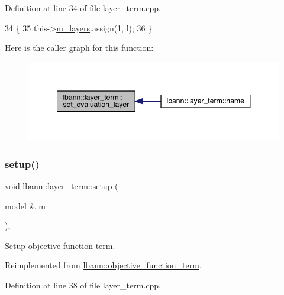Definition at line 34 of file layer\+\_\+term.\+cpp.


\begin{DoxyCode}
34                                               \{
35   this->\hyperlink{classlbann_1_1objective__function__term_a9269cf0a237eacd1e220ba2739f44334}{m\_layers}.assign(1, l);
36 \}
\end{DoxyCode}
Here is the caller graph for this function\+:\nopagebreak
\begin{figure}[H]
\begin{center}
\leavevmode
\includegraphics[width=348pt]{classlbann_1_1layer__term_a04ca36543288fb9c55ab99cc0cc2a648_icgraph}
\end{center}
\end{figure}
\mbox{\label{classlbann_1_1layer__term_ae6d84339fb80384ca2bf898fb854a7c9}} 
\subsubsection{\texorpdfstring{setup()}{setup()}}
{\footnotesize\ttfamily void lbann\+::layer\+\_\+term\+::setup (\begin{DoxyParamCaption}\item[{\hyperlink{classlbann_1_1model}{model} \&}]{m }\end{DoxyParamCaption})\hspace{0.3cm}{\ttfamily [override]}, {\ttfamily [virtual]}}

Setup objective function term. 

Reimplemented from \hyperlink{classlbann_1_1objective__function__term_a6c8dbdf18aac8676098189fb7b178e91}{lbann\+::objective\+\_\+function\+\_\+term}.



Definition at line 38 of file layer\+\_\+term.\+cpp.


